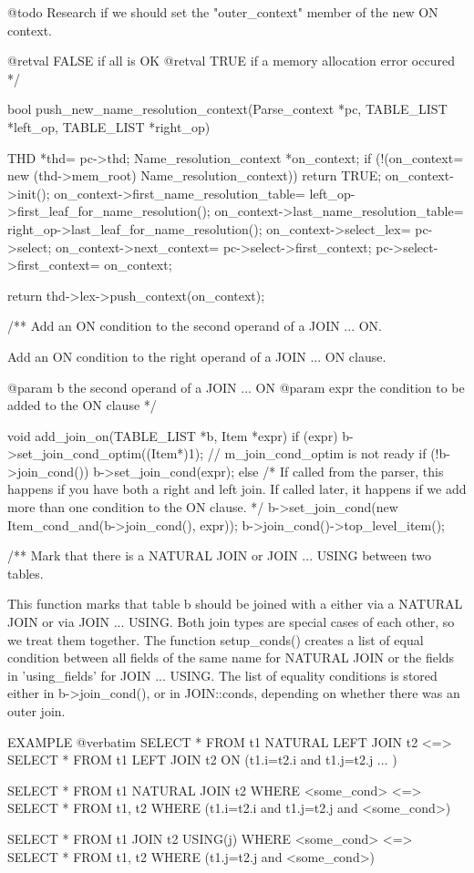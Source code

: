 \begin{DoxyVerb}
  @todo Research if we should set the "outer_context" member of the new ON
  context.

  @retval
    FALSE  if all is OK
  @retval
    TRUE   if a memory allocation error occured
*/

bool
push_new_name_resolution_context(Parse_context *pc,
                                 TABLE_LIST *left_op, TABLE_LIST *right_op)
{
  THD *thd= pc->thd;
  Name_resolution_context *on_context;
  if (!(on_context= new (thd->mem_root) Name_resolution_context))
    return TRUE;
  on_context->init();
  on_context->first_name_resolution_table=
    left_op->first_leaf_for_name_resolution();
  on_context->last_name_resolution_table=
    right_op->last_leaf_for_name_resolution();
  on_context->select_lex= pc->select;
  on_context->next_context= pc->select->first_context;
  pc->select->first_context= on_context;

  return thd->lex->push_context(on_context);
}


/**
  Add an ON condition to the second operand of a JOIN ... ON.

    Add an ON condition to the right operand of a JOIN ... ON clause.

  @param b     the second operand of a JOIN ... ON
  @param expr  the condition to be added to the ON clause
*/

void add_join_on(TABLE_LIST *b, Item *expr)
{
  if (expr)
  {
    b->set_join_cond_optim((Item*)1); // m_join_cond_optim is not ready
    if (!b->join_cond())
      b->set_join_cond(expr);
    else
    {
      /*
        If called from the parser, this happens if you have both a
        right and left join. If called later, it happens if we add more
        than one condition to the ON clause.
      */
      b->set_join_cond(new Item_cond_and(b->join_cond(), expr));
    }
    b->join_cond()->top_level_item();
  }
}


/**
  Mark that there is a NATURAL JOIN or JOIN ... USING between two
  tables.

    This function marks that table b should be joined with a either via
    a NATURAL JOIN or via JOIN ... USING. Both join types are special
    cases of each other, so we treat them together. The function
    setup_conds() creates a list of equal condition between all fields
    of the same name for NATURAL JOIN or the fields in 'using_fields'
    for JOIN ... USING. The list of equality conditions is stored
    either in b->join_cond(), or in JOIN::conds, depending on whether there
    was an outer join.

  EXAMPLE
  @verbatim
    SELECT * FROM t1 NATURAL LEFT JOIN t2
     <=>
    SELECT * FROM t1 LEFT JOIN t2 ON (t1.i=t2.i and t1.j=t2.j ... )

    SELECT * FROM t1 NATURAL JOIN t2 WHERE <some_cond>
     <=>
    SELECT * FROM t1, t2 WHERE (t1.i=t2.i and t1.j=t2.j and <some_cond>)

    SELECT * FROM t1 JOIN t2 USING(j) WHERE <some_cond>
     <=>
    SELECT * FROM t1, t2 WHERE (t1.j=t2.j and <some_cond>)\end{DoxyVerb}



